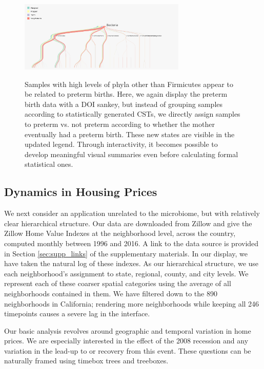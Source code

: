 \documentclass[12pt]{article}
\begin{document}
\begin{figure}

{\centering \includegraphics[width=300px]{figure/preterm_preterm}}

\caption{Samples with high levels of phyla other than Firmicutes appear to be
  related to preterm births. Here, we again display the preterm birth data with
  a DOI sankey, but instead of grouping samples according to statistically
  generated CSTs, we directly assign samples to preterm vs. not preterm
  according to whether the mother eventually had a preterm birth. These new
  states are visible in the updated legend. Through interactivity, it becomes
  possible to develop meaningful visual summaries even before calculating formal
  statistical ones.}
\label{fig:pretermpreterm}
\end{figure}

\subsection{Dynamics in Housing Prices}\label{zillow-study}

We next consider an application unrelated to the microbiome, but with relatively
clear hierarchical structure. Our data are downloaded from Zillow and give the
Zillow Home Value Indexes at the neighborhood level, across the country,
computed monthly between 1996 and 2016. A link to the data source is provided in
Section \ref{sec:supp_links} of the supplementary materials. In our display, we
have taken the natural log of these indexes. As our hierarchical structure, we
use each neighborhood's assignment to state, regional, county, and city levels.
We represent each of these coarser spatial categories using the average of all
neighborhoods contained in them. We have filtered down to the 890 neighborhoods
in California; rendering more neighborhoods while keeping all 246 timepoints
causes a severe lag in the interface.

Our basic analysis revolves around geographic and temporal variation in home
prices. We are especially interested in the effect of the 2008 recession and any
variation in the lead-up to or recovery from this event. These questions can be
naturally framed using timebox trees and treeboxes.
\end{document}
